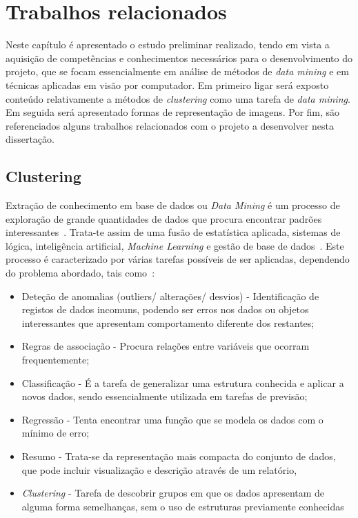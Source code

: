 
\chapter{Trabalhos relacionados} \label{chap:estarte}

Neste capítulo é apresentado o estudo preliminar realizado, tendo em vista a aquisição de competências e conhecimentos necessários para o desenvolvimento do projeto, que se focam essencialmente em análise de métodos de \textit{data mining} e em técnicas aplicadas em visão por computador. Em primeiro ligar será exposto conteúdo relativamente a métodos de \textit{clustering} como uma tarefa de \textit{data mining}. Em seguida será apresentado formas de representação de imagens. Por fim, são referenciados alguns trabalhos relacionados com o projeto a desenvolver nesta dissertação.

\section{Clustering} \label{sec:cluster}

Extração de conhecimento em base de dados ou \textit{Data Mining} é um processo de exploração de grande quantidades de dados que procura encontrar padrões interessantes~\citet{Han2006}. Trata-te assim de uma fusão de estatística aplicada, sistemas de lógica, inteligência artificial, \textit{Machine Learning} e gestão de base de dados~\citet{North2012}. Este processo é caracterizado por várias tarefas possíveis de ser aplicadas, dependendo do problema abordado, tais como~\citep{Fayyad1996}:

\begin{itemize}
\item Deteção de anomalias (outliers/ alterações/ desvios) - Identificação de registos de dados incomuns, podendo ser erros nos dados ou objetos interessantes que apresentam comportamento diferente dos restantes;
\item Regras de associação - Procura relações entre variáveis que ocorram frequentemente;
\item Classificação - É a tarefa de generalizar uma estrutura conhecida e aplicar a novos dados, sendo essencialmente utilizada em tarefas de previsão;
\item Regressão - Tenta encontrar uma função que se modela os dados com o mínimo de erro;
\item Resumo - Trata-se da representação mais compacta do conjunto de dados, que pode incluir visualização e descrição através de um relatório,
\item \textit{Clustering} - Tarefa de descobrir grupos em que os dados apresentam de alguma forma semelhanças, sem o uso de estruturas previamente conhecidas
\end{itemize}

